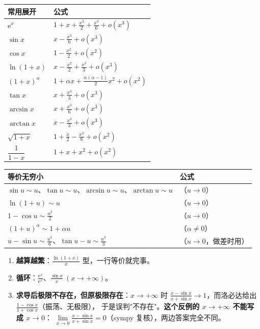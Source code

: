 \documentclass[11pt,a4paper]{ctexart}
\newcommand{\ee}{\mathrm{e}}
\begin{document}
\begin{center}
\footnotesize
\renewcommand{\arraystretch}{1.25}
\begin{tabularx}{\textwidth}{@{}>{\raggedright\arraybackslash}p{4.4cm} X@{}}
\toprule
\textbf{常用展开} & \textbf{公式}\\
\midrule
$\ee^x$ & $1+x+\frac{x^{2}}2+\frac{x^{3}}6+o(x^{3})$\\
$\sin x$ & $x-\frac{x^{3}}6+o(x^{3})$\\
$\cos x$ & $1-\frac{x^{2}}2+o(x^{2})$\\
$\ln(1+x)$ & $x-\frac{x^{2}}2+\frac{x^{3}}3+o(x^{3})$\\
$(1+x)^{\alpha}$ & $1+\alpha x+\frac{\alpha(\alpha-1)}{2}x^{2}+o(x^{2})$\\
$\tan x$ & $x+\frac{x^{3}}3+o(x^{3})$\\
$\arcsin x$ & $x+\frac{x^{3}}6+o(x^{3})$\\
$\arctan x$ & $x-\frac{x^{3}}3+o(x^{3})$\\
$\sqrt{1+x}$ & $1+\frac{x}{2}-\frac{x^{2}}8+o(x^{2})$\\
$\dfrac{1}{1-x}$ & $1+x+x^{2}+o(x^{2})$\\
\bottomrule
\end{tabularx}
\end{center}

\begin{center}
\footnotesize
\renewcommand{\arraystretch}{1.25}
\begin{tabularx}{\textwidth}{@{}>{\raggedright\arraybackslash}p{4.4cm} X@{}}
\toprule
\textbf{等价无穷小} & \textbf{公式}\\
\midrule
$\sin u\sim u$、$\tan u\sim u$、$\arcsin u\sim u$、$\arctan u\sim u$ & （$u\to0$）\\
$\ln(1+u)\sim u$ & （$u\to0$）\\
$1-\cos u\sim\frac{u^{2}}2$ & （$u\to0$）\\
$(1+u)^{\alpha}\sim1+\alpha u$ & （$\alpha\neq0$）\\
$u-\sin u\sim\frac{u^{3}}6$、$\tan u-u\sim\frac{u^{3}}3$ & （$u\to0$，做差时用）\\
\bottomrule
\end{tabularx}
\end{center}

\begin{warnbox}
\begin{enumerate}[label=(\alph*)]
  \item \textbf{越算越繁}：$\frac{\ln(1+x)}{x}$ 型，一行等价就完事。
  \item \textbf{循环}：$\frac{\ee^{x}}{\ee^{x}}$、$\frac{\sin x}{x}\ (x\to+\infty)$。
  \item \textbf{求导后极限不存在，但原极限存在}：$x\to+\infty$ 时
        $\frac{x-\sin x}{x+\sin x}\to1$，而洛必达给出 $\frac{1-\cos x}{1+\cos x}$（振荡、无极限），
        于是误判"不存在"。\textbf{这个反例的 $x\to+\infty$ 不能写成 $x\to0$}：
        $\lim\limits_{x\to0}\frac{x-\sin x}{x+\sin x}=0$（sympy 复核），两边答案完全不同。
\end{enumerate}
\end{warnbox}
\end{document}
